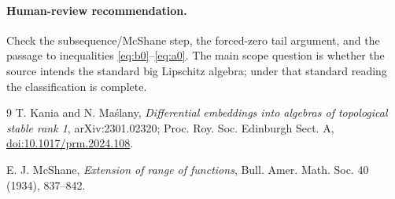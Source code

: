 \documentclass[11pt]{article}
\begin{document}
\paragraph{Human-review recommendation.}
Check the subsequence/McShane step, the forced-zero tail argument, and the
passage to inequalities \eqref{eq:b0}--\eqref{eq:a0}.  The main scope question
is whether the source intends the standard big Lipschitz algebra; under that
standard reading the classification is complete.

\begin{thebibliography}{9}
T. Kania and N. Ma\'slany,
\emph{Differential embeddings into algebras of topological stable rank 1},
arXiv:2301.02320; Proc. Roy. Soc. Edinburgh Sect. A,
\href{https://doi.org/10.1017/prm.2024.108}{doi:10.1017/prm.2024.108}.

E. J. McShane,
\emph{Extension of range of functions},
Bull. Amer. Math. Soc. 40 (1934), 837--842.
\end{thebibliography}
\end{document}
